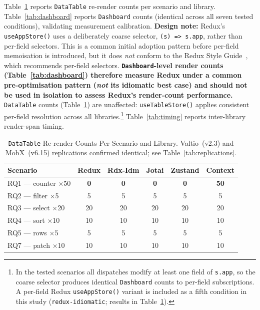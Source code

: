 \documentclass[conference]{IEEEtran}
\newcommand{\code}[1]{\texttt{\small #1}}
\begin{document}
Table~\ref{tab:datatable} reports \code{DataTable} re-render counts per
scenario and library. Table~\ref{tab:dashboard} reports \code{Dashboard}
counts (identical across all seven tested conditions), validating
measurement calibration. \textbf{Design note:} Redux's \code{useAppStore()} uses a
deliberately coarse selector, \code{(s) => s.app}, rather than
per-field selectors. This is a common initial adoption pattern before
per-field memoisation is introduced, but it does \emph{not} conform to
the Redux Style Guide~\cite{b7}, which recommends per-field selectors.
\textbf{\code{Dashboard}-level render counts (Table~\ref{tab:dashboard})
therefore measure Redux under a common pre-optimisation pattern
(\emph{not} its idiomatic best case) and should not be used in
isolation to assess Redux's render-count performance.}
\code{DataTable} counts (Table~\ref{tab:datatable}) are unaffected:
\code{useTableStore()} applies consistent per-field resolution across
all libraries.\footnote{In the tested scenarios all dispatches
modify at least one field of \code{s.app}, so the coarse selector
produces identical \code{Dashboard} counts to per-field subscriptions.
A per-field Redux \code{useAppStore()} variant is included as a fifth
condition in this study (\code{redux-idiomatic}; results in
Table~\ref{tab:datatable}).}
Table~\ref{tab:timing} reports inter-library render-span timing.

\begin{table}[tb]
\caption{\code{DataTable} Re-render Counts Per Scenario and Library.
  Valtio~(v2.3) and MobX~(v6.15) replications confirmed identical;
  see Table~\ref{tab:replications}.}
\label{tab:datatable}
\begin{center}
\small
\setlength{\tabcolsep}{4pt}
\begin{tabular}{lccccc}
\toprule
\textbf{Scenario}             & \textbf{Redux} & \textbf{Rdx-Idm}
                              & \textbf{Jotai} & \textbf{Zustand} & \textbf{Context} \\
\midrule
RQ1 --- counter $\times$50   & \textbf{0}  & \textbf{0}  & \textbf{0}  & \textbf{0}  & \textbf{50} \\
RQ2 --- filter $\times$5     & 5  & 5  & 5  & 5  & 5  \\
RQ3 --- select $\times$20    & 20 & 20 & 20 & 20 & 20 \\
RQ4 --- sort $\times$10      & 10 & 10 & 10 & 10 & 10 \\
RQ5 --- rows $\times$5       & 5  & 5  & 5  & 5  & 5  \\
RQ7 --- patch $\times$10     & 10 & 10 & 10 & 10 & 10 \\
\bottomrule
\end{tabular}
\end{center}
\end{table}
\end{document}
